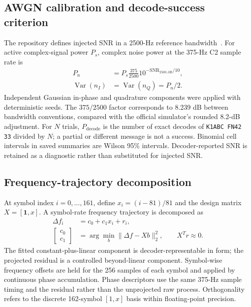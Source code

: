 \documentclass[conference]{IEEEtran}
\begin{document}
\subsection{AWGN calibration and decode-success criterion}
The repository defines injected SNR in a 2500-Hz reference bandwidth~\cite{wsjtxguide}. For active complex-signal power $P_s$, complex noise power at the 375-Hz C2 sample rate is
\begin{align}
P_n &= P_s\frac{375}{2500}10^{-\mathrm{SNR}_{2500,\mathrm{dB}}/10},\label{eq:awgn}\\
\operatorname{Var}(n_I)&=\operatorname{Var}(n_Q)=P_n/2.\nonumber
\end{align}
Independent Gaussian in-phase and quadrature components were applied with deterministic seeds. The $375/2500$ factor corresponds to 8.239 dB between bandwidth conventions, compared with the official simulator's rounded 8.2-dB adjustment. For $N$ trials, $P_{\mathrm{decode}}$ is the number of exact decodes of \texttt{K1ABC FN42 33} divided by $N$; a partial or different message is not a success. Binomial cell intervals in saved summaries are Wilson 95\% intervals. Decoder-reported SNR is retained as a diagnostic rather than substituted for injected SNR.

\subsection{Frequency-trajectory decomposition}
At symbol index $i=0,\ldots,161$, define $x_i=(i-81)/81$ and the design matrix $X=[\mathbf{1},x]$. A symbol-rate frequency trajectory is decomposed as
\begin{align}
\Delta f_i &= c_0+c_1x_i+r_i,\label{eq:decomposition}\\
\begin{bmatrix}c_0\\c_1\end{bmatrix}
&=\arg\min_b\|\Delta f-Xb\|_2^2,\qquad X^Tr\approx 0.\nonumber
\end{align}
The fitted constant-plus-linear component is decoder-representable in form; the projected residual is a controlled beyond-linear component. Symbol-wise frequency offsets are held for the 256 samples of each symbol and applied by continuous phase accumulation. Phase descriptors use the same 375-Hz sample timing and the residual rather than the unprojected raw process. Orthogonality refers to the discrete 162-symbol $[1,x]$ basis within floating-point precision.
\end{document}
